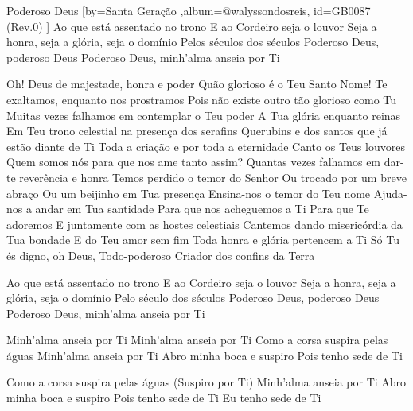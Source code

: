 \beginsong
{Poderoso Deus %
}[by={Santa Geração %
},album={@walyssondosreis},
id={GB0087 %
(Rev.0) %
}]
Ao que está assentado no trono
E ao Cordeiro seja o louvor
Seja a honra, seja a glória, seja o domínio
Pelos séculos dos séculos
Poderoso Deus, poderoso Deus
Poderoso Deus, minh'alma anseia por Ti

Oh! Deus de majestade, honra e poder
Quão glorioso é o Teu Santo Nome!
Te exaltamos, enquanto nos prostramos
Pois não existe outro tão glorioso como Tu
Muitas vezes falhamos em contemplar o Teu poder
A Tua glória enquanto reinas
Em Teu trono celestial na presença dos serafins
Querubins e dos santos que já estão diante de Ti
Toda a criação e por toda a eternidade
Canto os Teus louvores
Quem somos nós para que nos ame tanto assim?
Quantas vezes falhamos em dar-te reverência e honra
Temos perdido o temor do Senhor
Ou trocado por um breve abraço
Ou um beijinho em Tua presença
Ensina-nos o temor do Teu nome
Ajuda-nos a andar em Tua santidade
Para que nos acheguemos a Ti
Para que Te adoremos
E juntamente com as hostes celestiais
Cantemos dando misericórdia da Tua bondade
E do Teu amor sem fim
Toda honra e glória pertencem a Ti
Só Tu és digno, oh Deus, Todo-poderoso
Criador dos confins da Terra

Ao que está assentado no trono
E ao Cordeiro seja o louvor
Seja a honra, seja a glória, seja o domínio
Pelo século dos séculos
Poderoso Deus, poderoso Deus
Poderoso Deus, minh'alma anseia por Ti

Minh'alma anseia por Ti
Minh'alma anseia por Ti
Como a corsa suspira pelas águas
Minh'alma anseia por Ti
Abro minha boca e suspiro
Pois tenho sede de Ti

Como a corsa suspira pelas águas
(Suspiro por Ti)
Minh'alma anseia por Ti
Abro minha boca e suspiro
Pois tenho sede de Ti
Eu tenho sede de Ti


